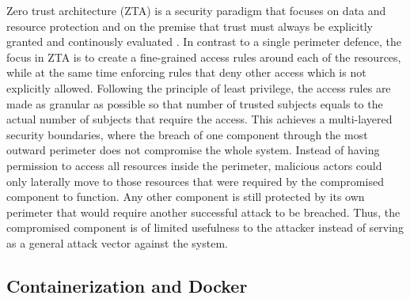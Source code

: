 \documentclass[english, 12pt, a4paper, sci, utf8, a-2b, online]{aaltothesis}
\begin{document}

Zero trust architecture (ZTA) is a security paradigm that focuses on data and resource protection and on the premise that trust must always be explicitly granted and continously evaluated \cite{kerman2020implementing, rose2020zero}. In contrast to a single perimeter defence, the focus in ZTA is to create a fine-grained access rules around each of the resources, while at the same time enforcing rules that deny other access which is not explicitly allowed. Following the principle of least privilege, the access rules are made as granular as possible so that number of trusted subjects equals to the actual number of subjects that require the access. This achieves a multi-layered security boundaries, where the breach of one component through the most outward perimeter does not compromise the whole system. Instead of having permission to access all resources inside the perimeter, malicious actors could only laterally move to those resources that were required by the compromised component to function. Any other component is still protected by its own perimeter that would require another successful attack to be breached. Thus, the compromised component is of limited usefulness to the attacker instead of serving as a general attack vector against the system.

\subsection{Containerization and Docker}
\end{document}
